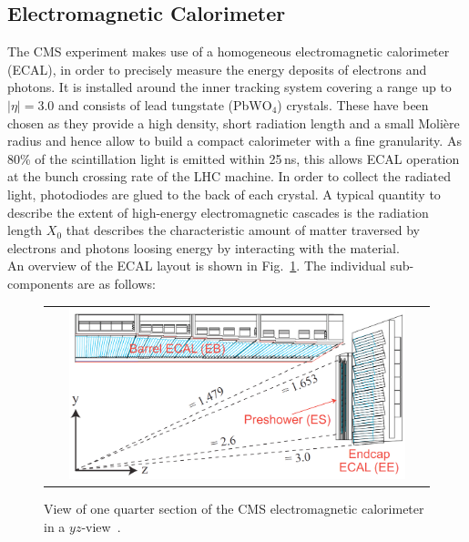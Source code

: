 \subsection{Electromagnetic Calorimeter}
\label{subsec:cms_ecal}
The CMS experiment makes use of a homogeneous electromagnetic calorimeter (ECAL), in order to precisely measure the energy deposits of electrons and photons. It is installed around the inner tracking system covering a range up to $|\eta| = 3.0$ and consists of lead tungstate (PbW$\mathrm{O}_4$) crystals. These have been chosen as they provide a high density, short radiation length and a small Moli\`{e}re radius and hence allow to build a compact calorimeter with a fine granularity. As 80\% of the scintillation light is emitted within 25\,ns, this allows ECAL operation at the bunch crossing rate of the LHC machine. In order to collect the radiated light, photodiodes are glued to the back of each crystal. A typical quantity to describe the extent of high-energy electromagnetic cascades is the radiation length $X_0$ that describes the characteristic amount of matter traversed by electrons and photons loosing energy by interacting with the material.\\
An overview of the ECAL layout is shown in Fig.~\ref{fig:CMS_ecal}. The individual sub-components are as follows:
\begin{figure}[!tp]
  \centering
  \begin{tabular}{c}
    \includegraphics[width=0.9\textwidth]{figures/Figures_Experimental_Apparatus_ECALRapidity.png}
  \end{tabular}
  \caption{View of one quarter section of the CMS electromagnetic calorimeter in a $yz$-view~\cite{bib:cmsptdr1}.}
  \label{fig:CMS_ecal}
\end{figure}

